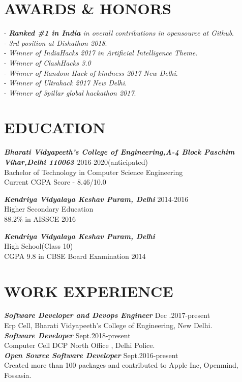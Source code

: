 \documentclass[margin, 10pt]{res}
\begin{document}
\begin{resume}
    
    
    \section{AWARDS \& HONORS}
    - {\sl {\bf Ranked \#1 in India} in overall contributions in opensource at Github}.\\
    - {\sl 3rd position at Dishathon 2018}.\\
    - {\sl Winner of IndiaHacks 2017 in Artificial Intelligence Theme}.\\
    - {\sl Winner of ClashHacks 3.0 }\\
    - {\sl Winner of Random Hack of kindness 2017 New Delhi}.\\
    - {\sl Winner of Ultrahack 2017 New Delhi}.\\
    - {\sl Winner of 3pillar global hackathon 2017}.\\    
    \section{EDUCATION} 
    {\sl \bf{Bharati Vidyapeeth's College of Engineering,A-4 Block Paschim Vihar,Delhi 110063 }} \hfill 2016-2020(anticipated)\\ Bachelor of Technology in Computer Science Engineering\\
    Current CGPA Score - 8.46/10.0
    
    {\sl \bf{Kendriya Vidyalaya Keshav Puram, Delhi}}
    \hfill 2014-2016 \\Higher Secondary Education\\ 88.2\% in AISSCE 2016
    
    {\sl \bf{Kendriya Vidyalaya Keshav Puram, Delhi}}\\High School(Class 10)\\CGPA 9.8 in CBSE Board Examination 2014
    
    \section{WORK EXPERIENCE}
    {\sl {\bf Software Developer and Devops Engineer }}\hfill Dec .2017-present \\
    Erp Cell, Bharati Vidyapeeth's College of Engineering, New Delhi.\\
    {\sl {\bf Software Developer }}\hfill Sept.2018-present \\
    Computer Cell DCP North Office , Delhi Police.\\
    {\sl {\bf Open Source Software Developer }}\hfill Sept.2016-present \\
    Created more than 100 packages and contributed to Apple Inc, Openmind, Fossasia.\\
  

\end{resume}
\end{document}

